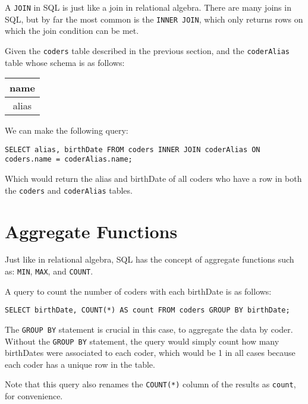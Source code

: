 A \texttt{JOIN} in SQL is just like a join in relational algebra.
There are many joins in SQL, but by far the most common is the
\texttt{INNER JOIN}, which only returns rows on which the join
condition can be met.

Given the \texttt{coders} table described in the previous section, and
the \texttt{coderAlias} table whose schema is as follows:

\begin{tabular}{|c|}
  
  \hline
  {\bf name} \\
  \hline
  alias \\
  \hline
  
\end{tabular}

We can make the following query:

\texttt{SELECT alias, birthDate \newline
FROM coders INNER JOIN coderAlias \newline
ON coders.name = coderAlias.name;}

Which would return the alias and birthDate of all coders who have a
row in both the \texttt{coders} and \texttt{coderAlias} tables.

\section{Aggregate Functions}

Just like in relational algebra, SQL has the concept of aggregate
functions such as: \texttt{MIN}, \texttt{MAX}, and \texttt{COUNT}.

A query to count the number of coders with each birthDate is as
follows:

\texttt{SELECT birthDate, COUNT(*) AS count FROM coders \newline
GROUP BY birthDate;}

The \texttt{GROUP BY} statement is crucial in this case, to aggregate
the data by coder.  Without the \texttt{GROUP BY} statement, the query
would simply count how many birthDates were associated to each coder,
which would be 1 in all cases because each coder has a unique row in
the table.

Note that this query also renames the \texttt{COUNT(*)} column of the
results as \texttt{count}, for convenience.
